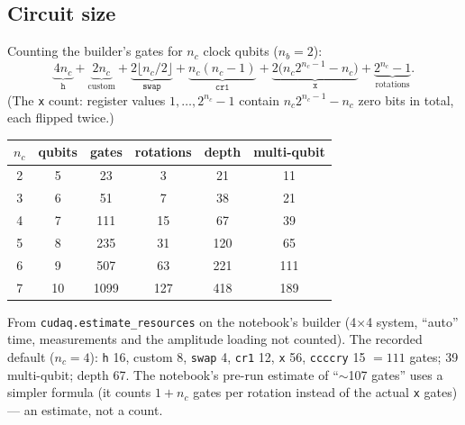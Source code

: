 \documentclass[11pt,a4paper,openany]{book}
\begin{document}
\subsection{Circuit size}
Counting the builder's gates for $n_c$ clock qubits ($n_b = 2$):
\[ \underbrace{4n_c}_{\texttt{h}} + \underbrace{2n_c}_{\text{custom}} + \underbrace{2\lfloor n_c/2\rfloor}_{\texttt{swap}} + \underbrace{n_c(n_c - 1)}_{\texttt{cr1}}
   + \underbrace{2\big(n_c2^{n_c-1} - n_c\big)}_{\texttt{x}} + \underbrace{2^{n_c} - 1}_{\text{rotations}}. \]
(The \texttt{x} count: register values $1, \dots, 2^{n_c} - 1$ contain $n_c2^{n_c-1} - n_c$ zero bits in total, each flipped twice.)
\begin{center}\small
\begin{tabular}{cccccc}
\toprule $n_c$ & qubits & gates & rotations & depth & multi-qubit\\ \midrule
2 & 5 & 23 & 3 & 21 & 11\\
3 & 6 & 51 & 7 & 38 & 21\\
4 & 7 & 111 & 15 & 67 & 39\\
5 & 8 & 235 & 31 & 120 & 65\\
6 & 9 & 507 & 63 & 221 & 111\\
7 & 10 & 1099 & 127 & 418 & 189\\ \bottomrule
\end{tabular}
\end{center}
{\small From \texttt{cudaq.estimate\_resources} on the notebook's builder (4$\times$4 system, ``auto'' time, measurements and the amplitude loading not counted).}
The recorded default ($n_c = 4$): \texttt{h} 16, custom 8, \texttt{swap} 4, \texttt{cr1} 12, \texttt{x} 56, \texttt{ccccry} 15 $= 111$ gates; 39 multi-qubit; depth 67.
The notebook's pre-run estimate of ``$\sim$107 gates'' uses a simpler formula (it counts $1 + n_c$ gates per rotation instead of the actual \texttt{x} gates) --- an estimate, not a count.
\end{document}
